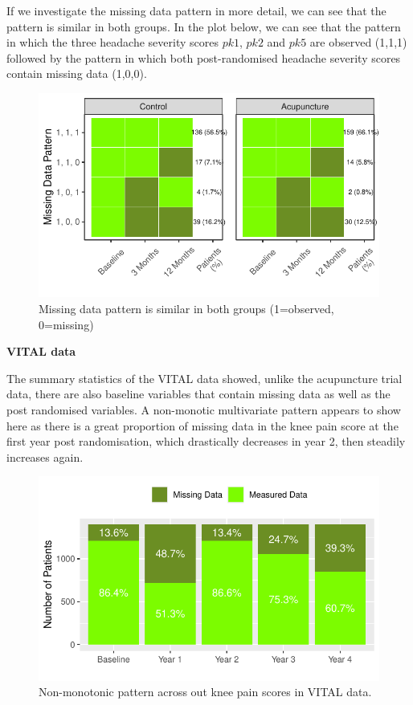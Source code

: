 \documentclass{article}
\newcommand{\pandocbounded}[1]{#1}
\begin{document}
If we investigate the missing data pattern in more detail, we can see
that the pattern is similar in both groups. In the plot below, we can
see that the pattern in which the three headache severity scores
\(pk1\), \(pk2\) and \(pk5\) are observed (1,1,1) followed by the
pattern in which both post-randomised headache severity scores contain
missing data (1,0,0).

\begin{figure}
\centering
\pandocbounded{\includegraphics[keepaspectratio]{Final_Report_files/figure-latex/unnamed-chunk-20-1.pdf}}
\caption{Missing data pattern is similar in both groups (1=observed,
0=missing)}
\end{figure}

\textbf{VITAL data}

The summary statistics of the VITAL data showed, unlike the acupuncture
trial data, there are also baseline variables that contain missing data
as well as the post randomised variables. A non-monotic multivariate
pattern appears to show here as there is a great proportion of missing
data in the knee pain score at the first year post randomisation, which
drastically decreases in year 2, then steadily increases again.

\begin{figure}
\centering
\pandocbounded{\includegraphics[keepaspectratio]{Final_Report_files/figure-latex/unnamed-chunk-21-1.pdf}}
\caption{Non-monotonic pattern across out knee pain scores in VITAL
data.}
\end{figure}
\end{document}

